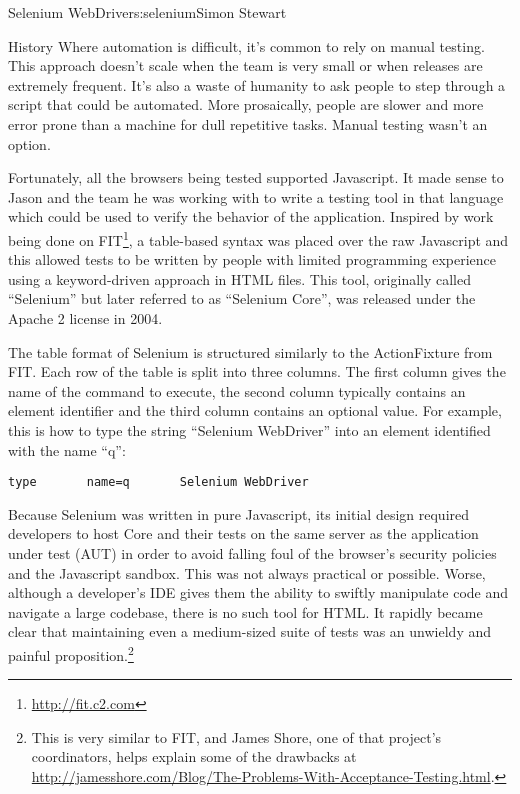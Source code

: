 \begin{aosachapter}{Selenium WebDriver}{s:selenium}{Simon Stewart}
\begin{aosasect1}{History}
Where automation is difficult, it's common to rely on manual
testing. This approach doesn't scale when the team is very small or
when releases are extremely frequent. It's also a waste of humanity to
ask people to step through a script that could be automated. More
prosaically, people are slower and more error prone than a machine for
dull repetitive tasks.  Manual testing wasn't an option.

Fortunately, all the browsers being tested supported Javascript. It
made sense to Jason and the team he was working with to write a
testing tool in that language which could be used to verify the
behavior of the application. Inspired by work being done on
FIT\footnote{\url{http://fit.c2.com}}, a table-based syntax was placed
over the raw Javascript and this allowed tests to be written by people
with limited programming experience using a keyword-driven approach in
HTML files. This tool, originally called ``Selenium'' but later
referred to as ``Selenium Core'', was released under the Apache 2
license in 2004.

The table format of Selenium is structured similarly to the
ActionFixture from FIT\@. Each row of the table is split into three
columns. The first column gives the name of the command to execute,
the second column typically contains an element identifier and the
third column contains an optional value. For example, this is how to
type the string ``Selenium WebDriver'' into an element identified with
the name ``q'':

\begin{verbatim}
type       name=q       Selenium WebDriver
\end{verbatim}

Because Selenium was written in pure Javascript,
its initial design required developers to host Core and
their tests on the same server as the application under test
(AUT) in order to avoid falling foul of the browser's security
policies and the Javascript sandbox. This was not always
practical or possible.  Worse, although a
developer's IDE gives them the ability to swiftly manipulate code and
navigate a large codebase, there is no such tool for HTML\@. It rapidly
became clear that maintaining even a medium-sized suite of tests was
an unwieldy and painful proposition.\footnote{This is very similar to
FIT, and James Shore, one of that project's coordinators, helps
explain some of the drawbacks at
\url{http://jamesshore.com/Blog/The-Problems-With-Acceptance-Testing.html}.}



\end{aosasect1}
\end{aosachapter}
